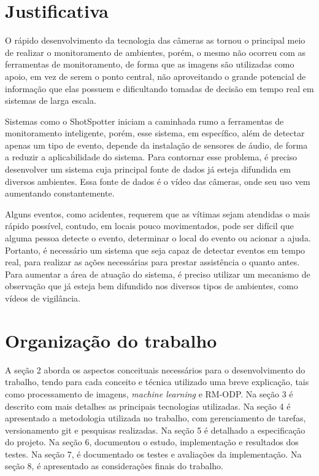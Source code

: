 \documentclass[]{politex}
\begin{document}
\section{Justificativa}
O rápido desenvolvimento da tecnologia das câmeras as tornou o principal meio de realizar o monitoramento de ambientes, porém, o mesmo não ocorreu com as ferramentas de monitoramento, de forma que as imagens são utilizadas como apoio, em vez de serem o ponto central, não aproveitando o grande potencial de informação que elas possuem e dificultando tomadas de decisão em tempo real em sistemas de larga escala.

Sistemas como o ShotSpotter iniciam a caminhada rumo a ferramentas de monitoramento inteligente, porém, esse sistema, em específico, além de detectar apenas um tipo de evento, depende da instalação de sensores de áudio, de forma a reduzir a aplicabilidade do sistema. Para contornar esse problema, é preciso desenvolver um sistema cuja principal fonte de dados já esteja difundida em diversos ambientes. Essa fonte de dados é o vídeo das câmeras, onde seu uso vem aumentando constantemente.

Alguns eventos, como acidentes, requerem que as vítimas sejam atendidas o mais rápido possível, contudo, em locais pouco movimentados, pode ser difícil que alguma pessoa detecte o evento, determinar o local do evento ou acionar a ajuda. Portanto, é necessário um sistema que seja capaz de detectar eventos em tempo real, para realizar as ações necessárias para prestar assistência o quanto antes. Para aumentar a área de atuação do sistema, é preciso utilizar um mecanismo de observação que já esteja bem difundido nos diversos tipos de ambientes, como vídeos de vigilância.


\section{Organização do trabalho}
A seção 2 aborda os aspectos conceituais necessários para o desenvolvimento do trabalho, tendo para cada conceito e técnica utilizado uma breve explicação, tais como processamento de imagens, \textit{machine learning} e  RM-ODP. Na seção 3 é descrito com mais detalhes as principais tecnologias utilizadas. Na seção 4 é apresentado a metodologia utilizada no trabalho, com gerenciamento de tarefas, versionamento git e pesquisas realizadas. Na seção 5 é detalhado a especificação do projeto. Na seção 6, documentou o estudo, implementação e resultados dos testes. Na seção 7, é documentado os testes e avaliações da implementação. Na seção 8, é apresentado as considerações finais do trabalho.
\end{document}
